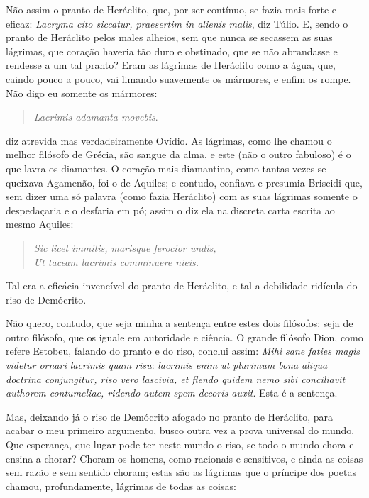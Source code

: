 Não assim o pranto de Heráclito, que, por ser contínuo, se fazia mais
forte e eficaz:
\emph{Lacryma cito siccatur, praesertim in alienis malis}, diz Túlio.
E, sendo o pranto de
Heráclito pelos males alheios, sem que nunca se secassem as suas
lágrimas, que coração haveria tão duro e obstinado, que se não
abrandasse e rendesse a um tal pranto? Eram as lágrimas de Heráclito
como a água, que, caindo pouco a pouco, vai limando suavemente os
mármores, e enfim os rompe. Não digo eu somente os mármores:


\begin{verse}
\emph{Lacrimis adamanta movebis}.
\end{verse}

\noindent{}diz atrevida mas verdadeiramente Ovídio. As lágrimas, como lhe chamou o
melhor filósofo de Grécia, são sangue da alma, e este (não o outro
fabuloso) é o que lavra os diamantes. O coração mais diamantino, como
tantas vezes se queixava Agamenão, foi o de Aquiles; e contudo, confiava
e presumia Briscidi que, sem dizer uma só palavra (como fazia Heráclito)
com as suas lágrimas somente o despedaçaria e o desfaria em pó; assim
o diz ela na discreta carta escrita ao mesmo Aquiles:

\begin{verse}
\emph{Sic licet immitis, marisque ferocior undis,}\\
\emph{Ut taceam lacrimis comminuere nieis.}
\end{verse}

Tal era a eficácia invencível do pranto de Heráclito, e tal a debilidade
ridícula do riso de Demócrito.

Não quero, contudo, que seja minha a sentença entre estes dois
filósofos: seja de outro filósofo, que os iguale em autoridade e
ciência. O grande filósofo Dion, como
refere Estobeu, falando do pranto e do riso, conclui assim: \emph{Mihi
sane faties magis videtur ornari lacrimis quam risu}: \emph{lacrimis
enim ut plurimum bona aliqua doctrina conjungitur, riso vero lascivia,
et flendo quidem nemo sibi conciliavit authorem contumeliae, ridendo autem spem decoris auxit}. Esta é a sentença.

Mas, deixando já o riso de Demócrito afogado no pranto de Heráclito,
para acabar o meu primeiro argumento, busco outra vez a prova universal
do mundo. Que esperança, que lugar pode ter neste mundo o riso, se todo
o mundo chora e ensina a chorar? Choram os homens, como racionais e
sensitivos, e ainda as coisas sem razão e sem sentido choram; estas são
as lágrimas que o príncipe dos poetas chamou, profundamente, lágrimas de
todas as coisas:

